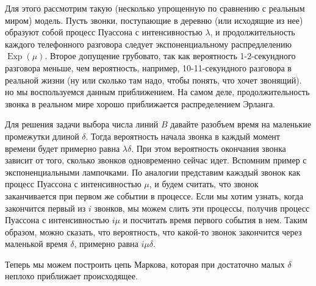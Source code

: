 \documentclass[12pt]{article}
\DeclareMathOperator{\Exp}{Exp}
\begin{document}
Для этого рассмотрим такую (несколько упрощенную по сравнению с реальным миром) модель. Пусть звонки, поступающие в деревню (или исходящие из нее) образуют собой процесс Пуассона с интенсивностью $\lambda$, и продолжительность каждого телефонного разговора следует экспоненциальному распредлелению $\Exp(\mu)$. Второе допущение грубовато, так как вероятность 1-2-секундного разговора меньше, чем вероятность, например, 10-11-секундного разговора в реальной жизни (ну или сколько там надо, чтобы понять, что хочет звонящий). но мы воспользуемся данным приближением. На самом деле, продолжительность звонка в реальном мире хорошо приближается распределением Эрланга.

Для решения задачи выбора числа линий $B$ давайте разобъем время на маленькие промежутки длиной $\delta$. Тогда вероятность начала звонка в каждый момент времени будет примерно равна $\lambda \delta$. При этом вероятность окончания звонка зависит от того, сколько звонков одновременно сейчас идет. Вспомним пример с экспоненциальными лампочками. По аналогии представим кажздый звонок как процесс Пуассона с интенсивностью $\mu$, и будем считать, что звонок заканчивается при первом же событии в процессе. Если мы хотим узнать, когда закончится первый из $i$ звонков, мы можем слить эти процессы, получив процесс Пуассона с интенсивностью $i\mu$ и посчитать время первого события в нем. Таким образом, можно сказать, что вероятность, что какой-то звонок закончится через маленькой время $\delta$, примерно равна $i\mu\delta$.

Теперь мы можем построить цепь Маркова, которая при достаточно малых $\delta$ неплохо приближает происходящее.
\end{document}
